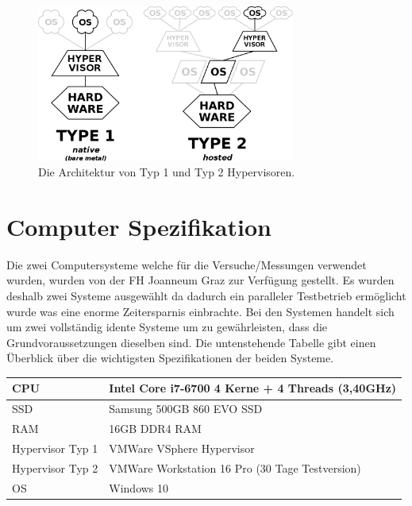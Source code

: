 \documentclass[conference]{IEEEtran}
\begin{document}
\begin{figure}[!h]
	\centering
	\includegraphics[keepaspectratio,width=8.5cm,height=0.75\textheight]{hypervisors.png}
	\caption{Die Architektur von Typ 1 und Typ 2 Hypervisoren.}
	\label{architecture}
\end{figure}

\section{Computer Spezifikation}
\label{Computer Spezifikation}
Die zwei Computersysteme welche für die Versuche/Messungen verwendet wurden, wurden von der FH Joanneum Graz zur Verfügung gestellt. Es wurden deshalb zwei Systeme ausgewählt da dadurch ein paralleler Testbetrieb ermöglicht wurde was eine enorme Zeitersparnis einbrachte. Bei den Systemen handelt sich um zwei vollständig idente Systeme um zu gewährleisten, dass die Grundvoraussetzungen dieselben sind. Die untenstehende Tabelle gibt einen Überblick über die wichtigsten Spezifikationen der beiden Systeme.

\begin{table}[!h]
\begin{tabular}{|l|l|}
\hline
CPU              & Intel Core i7-6700 4 Kerne + 4 Threads (3,40GHz) \\ \hline
SSD              & Samsung 500GB 860 EVO SSD                        \\ \hline
RAM              & 16GB DDR4 RAM                                    \\ \hline
Hypervisor Typ 1 & VMWare VSphere Hypervisor                        \\ \hline
Hypervisor Typ 2 & VMWare Workstation 16 Pro (30 Tage Testversion)  \\ \hline
OS               & Windows 10                                       \\ \hline
\end{tabular}
\end{table}
\end{document}
